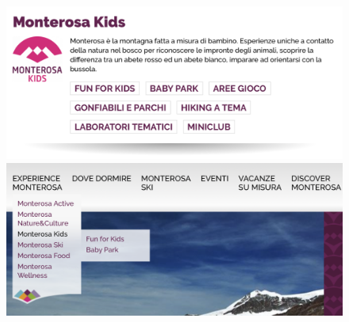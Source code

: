 \documentclass[a4paper, 11pt, parskip=half, headsepline]{scrreprt}
\begin{document}
\begin{figure}[H]
    \begin{minipage}[t]{0.5\textwidth}
        \centering
        \includegraphics[width=1\linewidth, keepaspectratio]{13-interaction-consistency}
        \caption{}
        \label{fig:interaction-consistency-03}
    \end{minipage}   
    \hspace*{\fill}
    \begin{minipage}[t]{0.5\textwidth}
        \centering
        \includegraphics[width=1\linewidth, keepaspectratio]{14-interaction-consistency}
        \caption{}
        \label{fig:interaction-consistency-04}
    \end{minipage} 
\end{figure}
\end{document}
